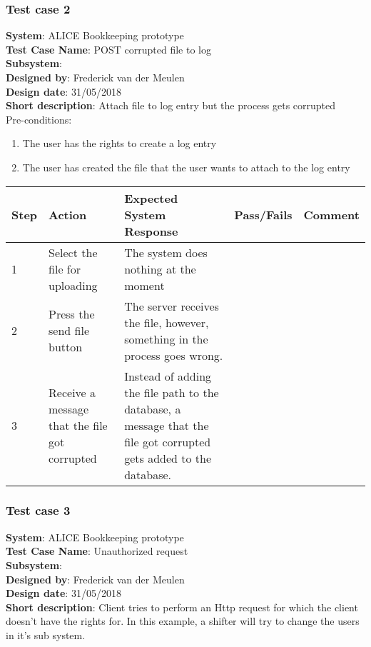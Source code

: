 \subsubsection{Test case 2}
\textbf{System}:   ALICE Bookkeeping prototype\\
\textbf{Test Case Name}:  POST corrupted file to log\\
\textbf{Subsystem}:  \\
\textbf{Designed by}:  Frederick van der Meulen\\
\textbf{Design date}:  31/05/2018\\
\textbf{Short description}: Attach file to log entry but the process gets corrupted \\

Pre-conditions: \\
\begin{enumerate}
\item The user has the rights to create a log entry
\item The user has created the file that the user wants to attach to the log entry
\end{enumerate}

\begin{longtable}{ | p{0.8cm} | p{4.5cm} | p{6cm} | p{1.5cm} | p{1.5cm} |}
\hline
Step & Action & Expected System Response & Pass/Fails & Comment \\ \hline
1 & Select the file for uploading & The system does nothing at the moment & & \\ \hline
2 & Press the send file button & The server receives the file, however, something in the process goes wrong. & & \\ \hline
3 & Receive a message that the file got corrupted & Instead of adding the file path to the database, a message that the file got corrupted gets added to the database. & & \\ \hline
\end{longtable}

\subsubsection{Test case 3}
\textbf{System}: ALICE Bookkeeping prototype\\
\textbf{Test Case Name}: Unauthorized request\\
\textbf{Subsystem}:  \\
\textbf{Designed by}: Frederick van der Meulen \\
\textbf{Design date}: 31/05/2018 \\
\textbf{Short description}: Client tries to perform an Http request for which the client doesn't have the rights for. In this example, a shifter will try to change the users in it's sub system. \\

